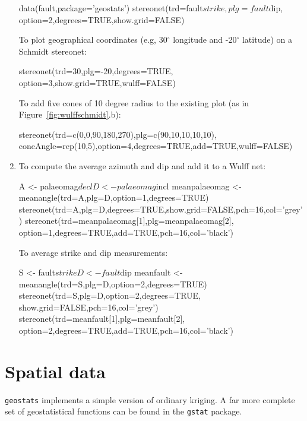 \begin{enumerate}
\begin{script}
data(fault,package='geostats')
stereonet(trd=fault$strike,plg=fault$dip,
          option=2,degrees=TRUE,show.grid=FALSE)
\end{script}

To plot geographical coordinates (e.g, 30$^\circ$ longitude and
-20$^\circ$ latitude) on a Schmidt stereonet:

\begin{script}
stereonet(trd=30,plg=-20,degrees=TRUE,
          option=3,show.grid=TRUE,wulff=FALSE)
\end{script}

To add five cones of 10 degree radius to the existing plot (as in
Figure~\ref{fig:wulffschmidt}.b):

\begin{script}[firstnumber=3]
stereonet(trd=c(0,0,90,180,270),plg=c(90,10,10,10,10),
          coneAngle=rep(10,5),option=4,degrees=TRUE,add=TRUE,wulff=FALSE)
\end{script}

\item To compute the average azimuth and dip and add it to a Wulff net:

\begin{script}
A <- palaeomag$decl
D <- palaeomag$incl
meanpalaeomag <- meanangle(trd=A,plg=D,option=1,degrees=TRUE)
stereonet(trd=A,plg=D,degrees=TRUE,show.grid=FALSE,pch=16,col='grey')
stereonet(trd=meanpalaeomag[1],plg=meanpalaeomag[2],
          option=1,degrees=TRUE,add=TRUE,pch=16,col='black')
\end{script}

To average strike and dip measurements:

\begin{script}
S <- fault$strike
D <- fault$dip
meanfault <- meanangle(trd=S,plg=D,option=2,degrees=TRUE)
stereonet(trd=S,plg=D,option=2,degrees=TRUE,
          show.grid=FALSE,pch=16,col='grey')
stereonet(trd=meanfault[1],plg=meanfault[2],
          option=2,degrees=TRUE,add=TRUE,pch=16,col='black')
\end{script}

\end{enumerate}

\section{Spatial data}
\label{sec:R-spatial}

\texttt{geostats} implements a simple version of ordinary kriging.  A
far more complete set of geostatistical functions can be found in the
\texttt{gstat} package.


